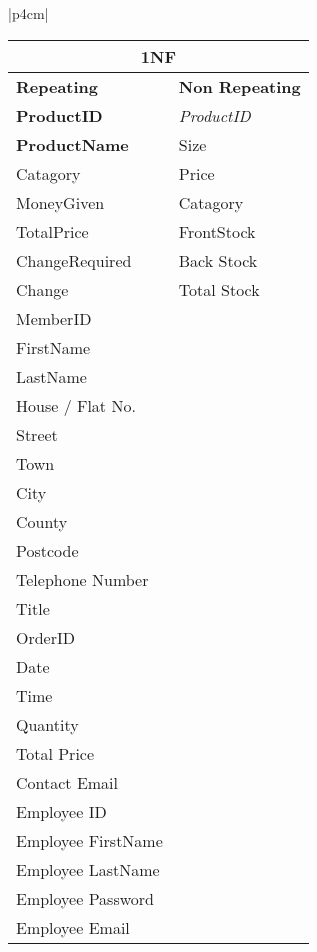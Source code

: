\begin{center}
\begin{tabular}{|p{4cm}|}
	
	

\begin{center}
    \begin{tabular}{|p{4cm}|p{4cm}|}
        \hline
	 \multicolumn{2}{|c|}{1NF} \\ \hline
	\textbf{Repeating} & \textbf{ Non Repeating}\\ \hline
	\textbf{ProductID}  & \textit{ProductID}\\ \hline
	\textbf{ProductName} & {Size}\\ \hline
	{Catagory} & {Price}\\ \hline
	{MoneyGiven} & {Catagory}\\ \hline
	{TotalPrice} & {FrontStock}\\ \hline
	{ChangeRequired} & {Back Stock}\\ \hline
	{Change} & {Total Stock}\\ \hline
	{MemberID} & {}\\ \hline
	{FirstName} & {}\\ \hline
	{LastName} & {}\\ \hline
	{House / Flat No.} & {}\\ \hline
	{Street} & {}\\ \hline
	{Town} & {}\\ \hline
	{City} & {}\\ \hline
	{County} & {}\\ \hline
	{Postcode} & {}\\ \hline
	{Telephone Number} & {}\\ \hline
	{Title} & {}\\ \hline
	{OrderID} & {}\\ \hline
	{Date} & {}\\ \hline
	{Time} & {}\\ \hline
	{Quantity} & {}\\ \hline
	{Total Price} & {}\\ \hline
	{Contact Email} & {}\\ \hline
	{Employee ID} & {}\\ \hline
	{Employee FirstName} & {}\\ \hline
	{Employee LastName} & {}\\ \hline
	{Employee Password} & {}\\ \hline
	{Employee Email} & {}\\ \hline


\end{tabular}
\end{center}
\end{tabular}
\end{center}
